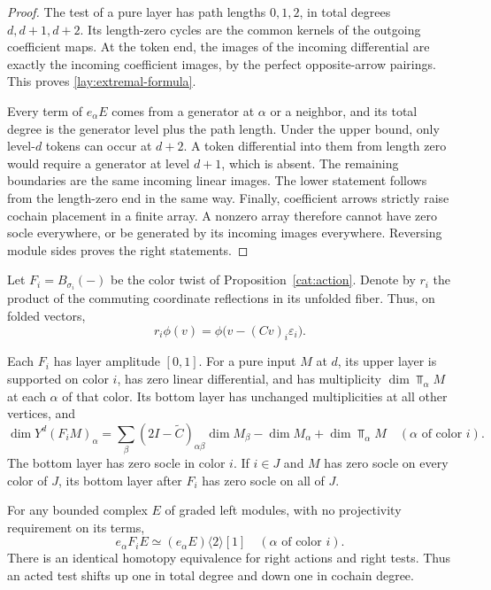 \begin{proof}
The test of a pure layer has path lengths $0,1,2$, in total degrees
$d,d+1,d+2$.  Its length-zero cycles are the common kernels of the
outgoing coefficient maps.  At the token end, the images of the
incoming differential are exactly the incoming coefficient images,
by the perfect opposite-arrow pairings.  This proves
\eqref{lay:extremal-formula}.

Every term of $e_\alpha E$ comes from a generator at $\alpha$ or a
neighbor, and its total degree is the generator level plus the path
length.  Under the upper bound, only level-$d$ tokens can occur at
$d+2$.  A token differential into them from length zero would require
a generator at level $d+1$, which is absent.  The remaining boundaries
are the same incoming linear images.  The lower statement follows
from the length-zero end in the same way.  Finally, coefficient arrows
strictly raise cochain placement in a finite array.  A nonzero array
therefore cannot have zero socle everywhere, or be generated by its
incoming images everywhere.  Reversing module sides proves the right
statements.
\end{proof}

Let $F_i=B_{\sigma_i}(-)$ be the color twist of
Proposition~\ref{cat:action}.  Denote by $r_i$ the product of the commuting
coordinate reflections in its unfolded fiber.  Thus, on folded
vectors,
\[
 r_i\phi(v)=\phi\bigl(v-(Cv)_i\varepsilon_i\bigr).
\]

\begin{lemma}\label{lay:positive}
Each $F_i$ has layer amplitude $[0,1]$.  For a pure input $M$ at $d$,
its upper layer is supported on color $i$, has zero linear
differential, and has multiplicity $\dim\Top_\alpha M$ at each
$\alpha$ of that color.  Its bottom layer has unchanged multiplicities
at all other vertices, and
\begin{equation}
 \dim Y^d(F_iM)_\alpha
 =\sum_\beta(2I-\widetilde C)_{\alpha\beta}\dim M_\beta
       -\dim M_\alpha+\dim\Top_\alpha M
 \quad(\alpha\text{ of color }i).
 \label{lay:positive-count}
\end{equation}
The bottom layer has zero socle in color $i$.  If $i\in J$ and $M$
has zero socle on every color of $J$, its bottom layer after $F_i$ has
zero socle on all of $J$.

For any bounded complex $E$ of graded left modules, with no
projectivity requirement on its terms,
\begin{equation}
 e_\alpha F_iE\simeq(e_\alpha E)\langle2\rangle[1]
 \quad(\alpha\text{ of color }i).
 \label{lay:positive-shift}
\end{equation}
There is an identical homotopy equivalence for right actions and right
tests.  Thus an acted test shifts up one in total degree and down one
in cochain degree.
\end{lemma}

